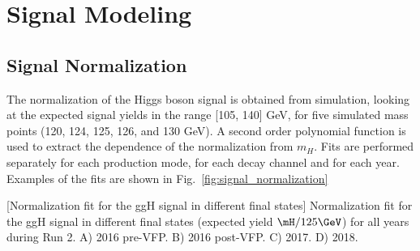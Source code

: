 \section{Signal Modeling}
\label{sec:signal_model}

\subsection{Signal Normalization}
\label{sec:SignalNormalization}
The normalization of the Higgs boson signal is obtained from simulation, 
looking at the expected signal yields in the range [105, 140] GeV, 
for five simulated mass points (120, 124, 125, 126, and 130 GeV).
A second order polynomial function is used to extract the dependence of the normalization from $m_{H}$.
Fits are performed separately for each production mode, for each decay channel and for each year. 
Examples of the fits are shown in Fig.~\ref{fig:signal_normalization}
\begin{multiFigure}
    \centering
        [Normalization fit for the ggH signal in different final states]
        {Normalization fit for the ggH signal in different final states (expected yield \vs $\mH / 125\GeV$) for all years during Run 2.
        \;A) 2016 pre-VFP.
        \;B) 2016 post-VFP.
        \;C) 2017.
        \;D) 2018.
        }
    \label{fig:signal_normalization}
\end{multiFigure}
%
